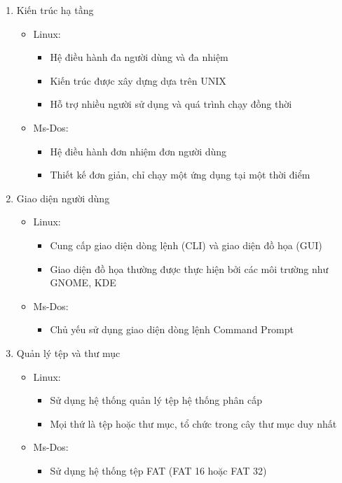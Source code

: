\documentclass[12pt,a4paper]{article}
\begin{document}
\begin{enumerate}
	\item Kiến trúc hạ tầng
	\begin{itemize}
		\item Linux:
		\begin{itemize}
			\item Hệ điều hành đa người dùng và đa nhiệm
			\item Kiến trúc được xây dựng dựa trên UNIX
			\item Hỗ trợ nhiều người sử dụng và quá trình chạy đồng thời
		\end{itemize}
		\item Ms-Dos:
		\begin{itemize}
			\item Hệ điều hành đơn nhiệm đơn người dùng
			\item Thiết kế đơn giản, chỉ chạy một ứng dụng tại một thời điểm
		\end{itemize} 
	\end{itemize}
	\item Giao diện người dùng
		\begin{itemize}
		\item Linux:
		\begin{itemize}
			\item Cung cấp giao diện dòng lệnh (CLI) và giao diện đồ họa (GUI)
			\item Giao diện đồ họa thường được thực hiện bởi các môi trường như GNOME, KDE
		\end{itemize}
		\item Ms-Dos:
		\begin{itemize}
			\item Chủ yếu sử dụng giao diện dòng lệnh Command Prompt
		\end{itemize} 
	\end{itemize}
	\item Quản lý tệp và thư mục
		\begin{itemize}
			\item Linux:
			\begin{itemize}
				\item Sử dụng hệ thống quản lý tệp hệ thống phân cấp
				\item Mọi thứ là tệp hoặc thư mục, tổ chức trong cây thư mục duy nhất
			\end{itemize}
			\item Ms-Dos:
			\begin{itemize}
				\item Sử dụng hệ thống tệp FAT (FAT 16 hoặc FAT 32) 

\end{itemize}
\end{itemize}
\end{enumerate}
\end{document}
